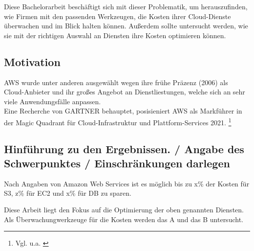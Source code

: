 Diese Bachelorarbeit beschäftigt sich mit dieser Problematik, um herauszufinden, wie Firmen mit den passenden Werkzeugen, die Kosten ihrer Cloud-Dienste überwachen und im Blick halten können. Außerdem sollte untersucht werden, wie sie mit der richtigen Auswahl an Diensten ihre Kosten optimieren können.
\newpage
\subsection{Motivation}
AWS wurde unter anderen ausgewählt wegen ihre frühe Präzenz (2006) als Cloud-Anbieter und ihr großes
Angebot an Dienstliestungen, welche sich an sehr viele Anwendungsfälle anpassen.
\\
Eine Recherche von GARTNER behauptet, posisieniert AWS als Markführer in der Magic Quadrant für Cloud-Infrastruktur und Plattform-Services 2021.
\footnote{Vgl. u.a. \cite{G01}}


\subsection{Hinführung zu den Ergebnissen. / Angabe des Schwerpunktes / Einschränkungen darlegen}
Nach Angaben von Amazon Web Services ist es möglich bis zu x\% der Kosten für S3, z\% für EC2 und x\% für DB zu sparen.


Diese Arbeit liegt den Fokus auf die Optimierung der oben genannten Diensten.
Als Überwachungwerkzeuge für die Kosten werden das A und das B untersucht. 
\\
